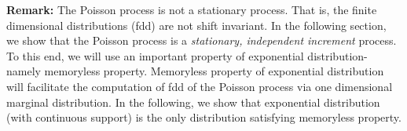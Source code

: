 \documentclass[a4paper,10pt]{article}
\theoremstyle{plain}
\theoremstyle{definition}
\begin{document}
\textbf{Remark:} The Poisson process is not a stationary process. That is, the finite dimensional distributions (fdd) are not shift invariant. In the following section, we show that the Poisson process is a \textit{stationary,  independent increment} process. To this end, we will use an important property of exponential distribution- namely memoryless property. Memoryless property of exponential distribution will facilitate the computation of fdd of the Poisson process via one dimensional marginal distribution. In the following, we show that exponential distribution (with  continuous support) is the only distribution satisfying memoryless property.
%
%
%
%
\end{document}
